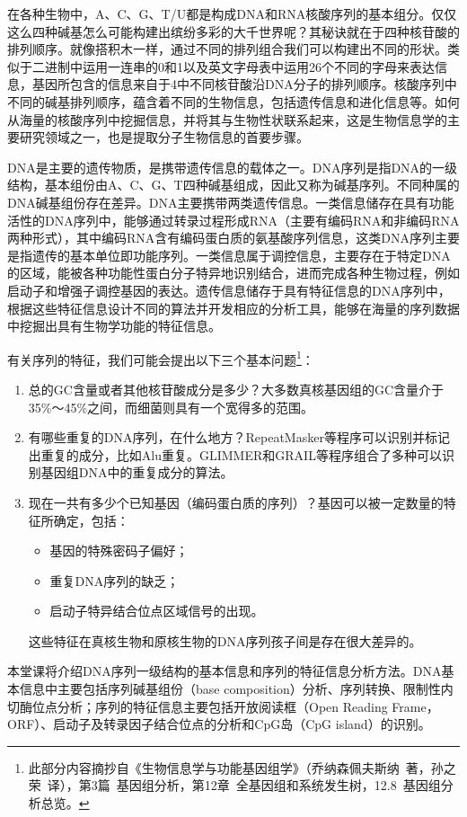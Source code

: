 \documentclass[11pt,a4paper,twoside]{book}
\begin{document}
在各种生物中，A、C、G、T/U都是构成DNA和RNA核酸序列的基本组分。仅仅这么四种碱基怎么可能构建出缤纷多彩的大千世界呢？其秘诀就在于四种核苷酸的排列顺序。就像搭积木一样，通过不同的排列组合我们可以构建出不同的形状。类似于二进制中运用一连串的0和1以及英文字母表中运用26个不同的字母来表达信息，基因所包含的信息来自于4中不同核苷酸沿DNA分子的排列顺序。核酸序列中不同的碱基排列顺序，蕴含着不同的生物信息，包括遗传信息和进化信息等。如何从海量的核酸序列中挖掘信息，并将其与生物性状联系起来，这是生物信息学的主要研究领域之一，也是提取分子生物信息的首要步骤。

DNA是主要的遗传物质，是携带遗传信息的载体之一。DNA序列是指DNA的一级结构，基本组份由A、C、G、T四种碱基组成，因此又称为碱基序列。不同种属的DNA碱基组份存在差异。DNA主要携带两类遗传信息。一类信息储存在具有功能活性的DNA序列中，能够通过转录过程形成RNA（主要有编码RNA和非编码RNA两种形式），其中编码RNA含有编码蛋白质的氨基酸序列信息，这类DNA序列主要是指遗传的基本单位即功能序列。一类信息属于调控信息，主要存在于特定DNA的区域，能被各种功能性蛋白分子特异地识别结合，进而完成各种生物过程，例如启动子和增强子调控基因的表达。遗传信息储存于具有特征信息的DNA序列中，根据这些特征信息设计不同的算法并开发相应的分析工具，能够在海量的序列数据中挖掘出具有生物学功能的特征信息。

有关序列的特征，我们可能会提出以下三个基本问题\footnote{此部分内容摘抄自《生物信息学与功能基因组学》（乔纳森\textbullet 佩夫斯纳\ 著，孙之荣\ 译），第3篇\ 基因组分析，第12章\ 全基因组和系统发生树，12.8\ 基因组分析总览。}：
\begin{enumerate}
  \item 总的GC含量或者其他核苷酸成分是多少？大多数真核基因组的GC含量介于35\%～45\%之间，而细菌则具有一个宽得多的范围。
  \item 有哪些重复的DNA序列，在什么地方？RepeatMasker等程序可以识别并标记出重复的成分，比如Alu重复。GLIMMER和GRAIL等程序组合了多种可以识别基因组DNA中的重复成分的算法。
  \item 现在一共有多少个已知基因（编码蛋白质的序列）？基因可以被一定数量的特征所确定，包括：
    \begin{itemize}
      \item 基因的特殊密码子偏好；
      \item 重复DNA序列的缺乏；
      \item 启动子特异结合位点区域信号的出现。
    \end{itemize}
    这些特征在真核生物和原核生物的DNA序列孩子间是存在很大差异的。
\end{enumerate}

本堂课将介绍DNA序列一级结构的基本信息和序列的特征信息分析方法。DNA基本信息中主要包括序列碱基组份（base composition）分析、序列转换、限制性内切酶位点分析；序列的特征信息主要包括开放阅读框（Open Reading Frame，ORF）、启动子及转录因子结合位点的分析和CpG岛（CpG island）的识别。
\end{document}
